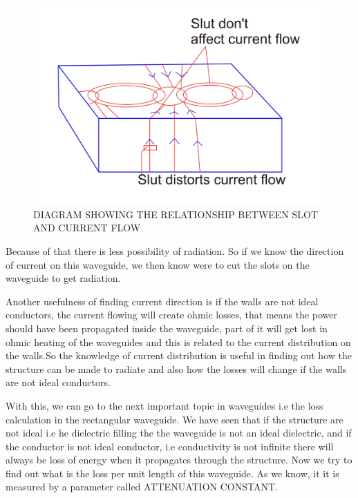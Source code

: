 \begin{figure}[h]
\centering
\includegraphics[width=1\linewidth]{./graphics/lecture-image-10.png}
\caption{DIAGRAM SHOWING THE RELATIONSHIP BETWEEN SLOT AND CURRENT FLOW}
\end{figure}
 Because of that there is less possibility of radiation. So if we know the direction of current on this waveguide, we then know were to cut the slots on the waveguide to get radiation.

Another usefulness of finding current direction is if the walls are not ideal conductors, the current flowing will create ohmic losses, that means the power should have been propagated inside the waveguide, part of it will get lost in ohmic heating of the waveguides and this is related to the current distribution on the walls.So the knowledge of current distribution is useful in finding out how the structure can be made to radiate and also how the losses will change if the walls are not ideal conductors.
	
With this, we can go to the next important topic in waveguides i.e the loss calculation in the rectangular waveguide. We have seen that if the structure are not ideal i.e he dielectric filling the the waveguide is not an ideal dielectric, and if the conductor is not ideal conductor, i.e conductivity is not infinite there will always be loss of energy when it propagates through the structure.
Now we try to find out what is the loss per unit length of this waveguide. As we know, it it is measured by a parameter called ATTENUATION CONSTANT.

